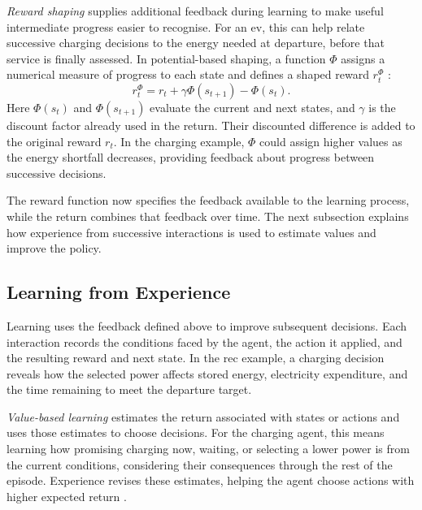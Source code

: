 \emph{Reward shaping} supplies additional feedback during learning to make useful intermediate progress easier to recognise. For an \gls{ev}, this can help relate successive charging decisions to the energy needed at departure, before that service is finally assessed. In potential-based shaping, a function $\Phi$ assigns a numerical measure of progress to each state and defines a shaped reward $r_t^{\Phi}$ \parencite{ng1999shaping}:
\begin{equation}
r_t^{\Phi}=r_t+\gamma\Phi(s_{t+1})-\Phi(s_t).
\label{eq:ch2-potential-shaping}
\end{equation}
Here $\Phi(s_t)$ and $\Phi(s_{t+1})$ evaluate the current and next states, and $\gamma$ is the discount factor already used in the return. Their discounted difference is added to the original reward $r_t$. In the charging example, $\Phi$ could assign higher values as the energy shortfall decreases, providing feedback about progress between successive decisions.

The reward function now specifies the feedback available to the learning process, while the return combines that feedback over time. The next subsection explains how experience from successive interactions is used to estimate values and improve the policy.

\subsection{Learning from Experience}
\label{sec:ch2-experience}
\label{sec:ch2-policy-gradient}

Learning uses the feedback defined above to improve subsequent decisions. Each interaction records the conditions faced by the agent, the action it applied, and the resulting reward and next state. In the \gls{rec} example, a charging decision reveals how the selected power affects stored energy, electricity expenditure, and the time remaining to meet the departure target.

\emph{Value-based learning} estimates the return associated with states or actions and uses those estimates to choose decisions. For the charging agent, this means learning how promising charging now, waiting, or selecting a lower power is from the current conditions, considering their consequences through the rest of the episode. Experience revises these estimates, helping the agent choose actions with higher expected return \parencite{sutton2018rl,watkins1992qlearning}.

